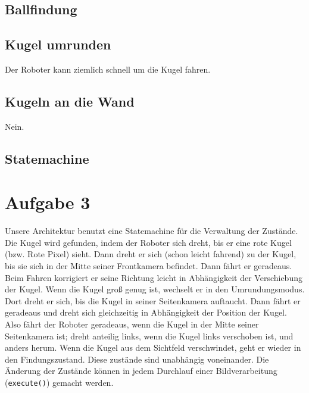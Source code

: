 \documentclass{../Vorlage/mat}
\begin{document}
\subsection*{Ballfindung}


\subsection*{Kugel umrunden}
Der Roboter kann ziemlich schnell um die Kugel fahren.


\subsection*{Kugeln an die Wand}
Nein.

\subsection*{Statemachine}


\section*{Aufgabe 3}
Unsere Architektur benutzt eine Statemachine für die Verwaltung der Zustände.
Die Kugel wird gefunden, indem der Roboter sich dreht, bis er eine rote Kugel (bzw. Rote Pixel) sieht. Dann dreht er sich (schon leicht fahrend) zu der Kugel, bis sie sich in der Mitte seiner Frontkamera befindet. Dann fährt er geradeaus. Beim Fahren korrigiert er seine Richtung leicht in Abhängigkeit der Verschiebung der Kugel. Wenn die Kugel groß genug ist, wechselt er in den Umrundungsmodus. Dort dreht er sich, bis die Kugel in seiner Seitenkamera auftaucht. Dann fährt er geradeaus und dreht sich gleichzeitig in Abhängigkeit der Position der Kugel. Also fährt der Roboter geradeaus, wenn die Kugel in der Mitte seiner Seitenkamera ist; dreht anteilig links, wenn die Kugel links verschoben ist, und anders herum. Wenn die Kugel aus dem Sichtfeld verschwindet, geht er wieder in den Findungszustand. Diese zustände sind unabhängig voneinander. Die Änderung der Zustände können in jedem Durchlauf einer Bildverarbeitung (\texttt{execute()}) gemacht werden.
\end{document}
